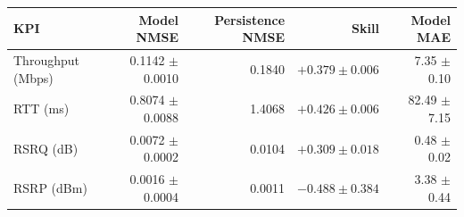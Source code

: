 \begin{tabular}{lrrrr}
\toprule
KPI & Model NMSE & Persistence NMSE & Skill & Model MAE \\
\midrule
Throughput (Mbps) & 0.1142 $\pm$ 0.0010 & 0.1840 & $+0.379\pm0.006$ & 7.35 $\pm$ 0.10 \\
RTT (ms) & 0.8074 $\pm$ 0.0088 & 1.4068 & $+0.426\pm0.006$ & 82.49 $\pm$ 7.15 \\
RSRQ (dB) & 0.0072 $\pm$ 0.0002 & 0.0104 & $+0.309\pm0.018$ & 0.48 $\pm$ 0.02 \\
RSRP (dBm) & 0.0016 $\pm$ 0.0004 & 0.0011 & $-0.488\pm0.384$ & 3.38 $\pm$ 0.44 \\
\bottomrule
\end{tabular}
